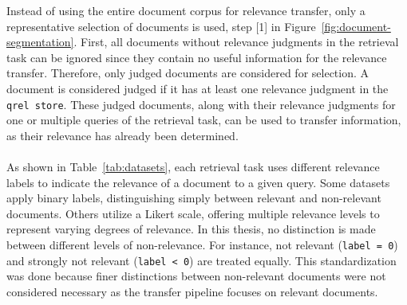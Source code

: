 Instead of using the entire document corpus for relevance transfer, only a representative selection of documents is used, step [1] in Figure~\ref{fig:document-segmentation}. First, all documents without relevance judgments in the retrieval task can be ignored since they contain no useful information for the relevance transfer. Therefore, only judged documents are considered for selection. A document is considered judged if it has at least one relevance judgment in the \texttt{qrel store}. These judged documents, along with their relevance judgments for one or multiple queries of the retrieval task, can be used to transfer information, as their relevance has already been determined.
\\\\
As shown in Table~\ref{tab:datasets}, each retrieval task uses different relevance labels to indicate the relevance of a document to a given query. Some datasets apply binary labels, distinguishing simply between relevant and non-relevant documents. Others utilize a Likert scale, offering multiple relevance levels to represent varying degrees of relevance. In this thesis, no distinction is made between different levels of non-relevance. For instance, \glqq not relevant\grqq{} (\texttt{label = 0}) and \glqq strongly not relevant\grqq{} (\texttt{label < 0}) are treated equally. This standardization was done because finer distinctions between non-relevant documents were not considered necessary as the transfer pipeline focuses on relevant documents.
\\\\\\\\\\\\
